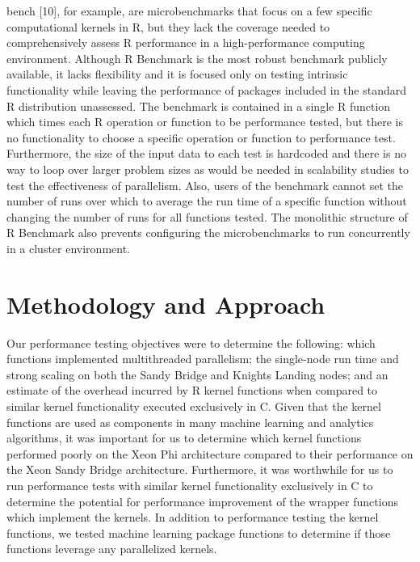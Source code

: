 bench [10], for example, are microbenchmarks that focus on a few specific computational
kernels in R, but they lack the coverage needed to comprehensively assess R performance in
a high-performance computing environment. Although R Benchmark is the most robust
benchmark publicly available, it lacks flexibility and it is focused only on testing
intrinsic functionality while leaving the performance of packages included in the standard
R distribution unassessed.  The benchmark is contained in a single R function which times
each R operation or function to be performance tested, but there is no functionality to
choose a specific operation or function to performance test. Furthermore, the size of the
input data to each test is hardcoded and there is no way to loop over larger problem sizes
as would be needed in scalability studies to test the effectiveness of parallelism.  Also,
users of the benchmark cannot set the number of runs over which to average the run time of
a specific function without changing the number of runs for all functions tested.  The
monolithic structure of R Benchmark also prevents configuring the microbenchmarks to run
concurrently in a cluster environment.


\section{Methodology and Approach}
Our performance testing objectives were to determine the following: which
  functions implemented multithreaded parallelism; the single-node
  run time and strong scaling on both the Sandy Bridge and Knights
  Landing nodes; and an estimate of the overhead incurred by R kernel functions
  when compared to similar kernel functionality executed exclusively in C.
Given that the kernel functions are used as components in many machine learning
  and analytics algorithms, it was important for us to determine which kernel
  functions performed poorly on the Xeon Phi architecture compared to their
  performance on the Xeon Sandy Bridge architecture.
Furthermore, it was worthwhile for us to run performance tests with
  similar kernel functionality exclusively in C to determine the potential
  for performance improvement of the wrapper functions which implement the
  kernels.
In addition to performance testing the kernel functions, we tested machine
  learning package functions to determine if those functions leverage any
  parallelized kernels.


